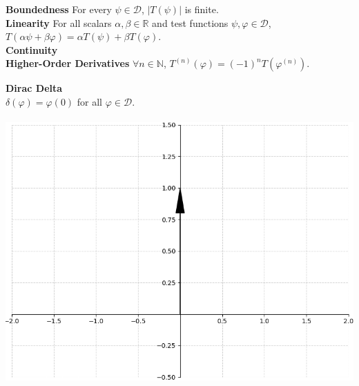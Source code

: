 \documentclass[8pt]{article}
\begin{document}
\noindent \textbf{Boundedness} For every $\psi \in \mathcal{D}$, $|T(\psi)|$ is finite. \\
\noindent \textbf{Linearity} For all scalars $\alpha, \beta \in \mathbb{R}$ and test functions $\psi, \varphi \in \mathcal{D}$,
    $
    T(\alpha \psi + \beta \varphi) = \alpha T(\psi) + \beta T(\varphi).
    $ \\
\noindent \textbf{Continuity} \\ \noindent{}
\noindent \textbf{Higher-Order Derivatives} $\forall n \in \mathbb{N}$, $T^{(n)}(\varphi) = (-1)^n T(\varphi^{(n)})$. \\ \vspace*{-30px}
\noindent
\begin{minipage}[t]{0.24\textwidth}
    \textbf{Dirac Delta}\\
    $\delta(\varphi) = \varphi(0)$ for all $\varphi \in \mathcal{D}.$\\ \smallskip \\
    \includegraphics[width=1.05\linewidth]{images/dirac_delta.png}
\end{minipage}
\hfill
\end{document}
